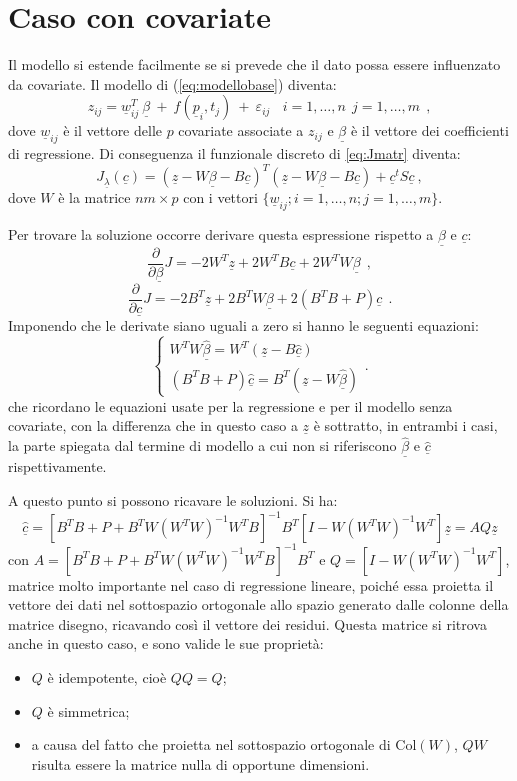 \documentclass[a4paper,11pt,twoside,openright]{book}							%
\begin{document}
\section{Caso con covariate}

Il modello si estende facilmente se si prevede che il dato possa essere influenzato da covariate. Il modello di (\ref{eq:modellobase}) diventa:
\begin{equation}
\label{eq:modellobasecovar}
z_{ij}= \underline w_{ij}^T\  \underline \beta   \ + \  f(\underline p_i,t_j)\ +\ \varepsilon_{ij}\ \ \ \ i = 1,\ldots,n\ \ j=1,\ldots,m \ \ ,
\end{equation}
dove $\underline w_{ij}$ è il vettore delle $p$ covariate associate a $z_{ij}$ e $\underline \beta$ è il vettore dei coefficienti di regressione. Di conseguenza il funzionale discreto di \ref{eq:Jmatr} diventa:
$$ J_{\underline \lambda }(\underline c) = (\underline z - W \underline \beta - B \underline c)^T (\underline z - W \underline \beta - B \underline c) + \underline c^t S \underline c  \ ,$$
dove $W$ è la matrice $nm \times p$ con i vettori $ \{\underline w_{ij}; i=1,\ldots,n;j=1,\ldots,m\}$.

Per trovare la soluzione occorre derivare questa espressione rispetto a $\underline \beta$ e $\underline c$:
$$
\frac{\partial}{\partial \underline \beta}J= -2W^T \underline z + 2W^T B \underline c + 2 W^TW \underline \beta \ \ ,
$$
$$
\frac{\partial}{\partial \underline c}J= -2 B^T \underline z + 2 B^T W \underline \beta + 2(B^T B + P) \underline c \ \ .
$$
Imponendo che le derivate siano uguali a zero si hanno le seguenti equazioni:
$$
\begin{cases}
W^TW \hat{\underline \beta} = W^T(\underline z - B \hat{\underline c})  \\
(B^T B + P) \hat{\underline c}=B^T(\underline z -W \hat{\underline \beta})
\end{cases}.
$$
che ricordano le equazioni usate per la regressione e per il modello senza covariate, con la differenza che in questo caso a $\underline z$ è sottratto, in entrambi i casi, la parte spiegata dal termine di modello a cui non si riferiscono $\hat{\underline \beta}$ e $\hat{\underline c}$ rispettivamente.

A questo punto si possono ricavare le soluzioni. Si ha:
$$
\hat  {\underline c}=[B^TB+P+B^TW(W^TW)^{-1}W^TB]^{-1}B^T[I-W(W^TW)^{-1}W^T]\underline z=AQ \underline z
$$
con $A=[B^TB+P+B^TW(W^TW)^{-1}W^TB]^{-1}B^T$ e $Q=[I-W(W^TW)^{-1}W^T]$, matrice molto importante nel caso di regressione lineare, poiché essa proietta il vettore dei dati nel sottospazio ortogonale allo spazio generato dalle colonne della matrice disegno, ricavando così il vettore dei residui. Questa matrice si ritrova anche in questo caso, e sono valide le sue proprietà:
\begin{itemize}
\item $Q$ è idempotente, cioè $QQ=Q$;
\item $Q$ è simmetrica;
\item a causa del fatto che proietta nel sottospazio ortogonale di $\mathrm{Col}(W)$, $QW$ risulta essere la matrice nulla di opportune dimensioni. 
\end{itemize}
\end{document}
